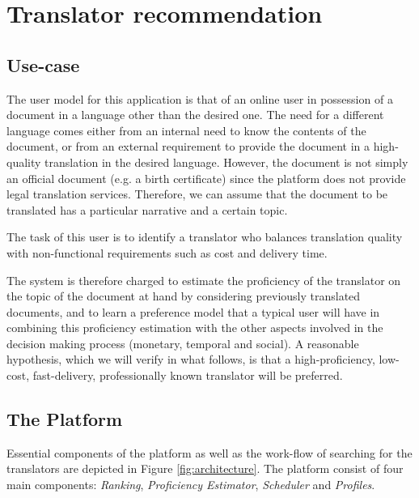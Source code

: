 \section{Translator recommendation}
\label{sec:casestudy}
\subsection{Use-case}\label{sec:usecase}
The user model for this application is that of an online user in possession of a document in a language other than the desired one. The need for a different language comes either from an internal need to know the contents of the document, or from an external requirement to provide the document in a high-quality translation in the desired language. However, the document is not simply an official document (e.g. a birth certificate) since the platform does not provide legal translation services. Therefore, we can assume that the document to be translated has a particular narrative and a certain topic. 

The task of this user is to identify a translator who balances translation quality with non-functional requirements such as cost and delivery time.  

The system is therefore charged to estimate the proficiency of the translator on the topic of the document at hand by considering previously translated documents, and to learn a preference model that a typical user will have in combining this proficiency estimation with the other aspects involved in the decision making process (monetary, temporal and social). A reasonable hypothesis, which we will verify in what follows, is that a high-proficiency, low-cost, fast-delivery, professionally known translator will be preferred. 

\subsection{The Platform}\label{sec:platform}
Essential components of the platform as well as the work-flow of searching for the translators are depicted in Figure \ref{fig:architecture}. The platform consist of four main components: \textit{Ranking}, \textit{Proficiency Estimator}, \textit{Scheduler} and \textit{Profiles}.

